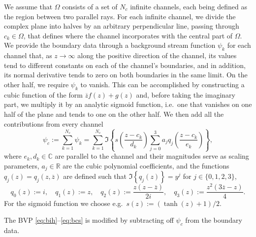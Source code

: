 \documentclass{article}
\newcommand{\reals}{\mathbb{R}}
\newcommand{\conj}[1]{{\overline{#1}}}
\newcommand{\imag}[1]{{\Im\left\{#1\right\}}}
\begin{document}
We assume that $\Omega$ consists of a set of $N_c$ infinite channels, each
being defined as the region between two parallel rays.  
For each infinite channel, we divide the complex
plane into halves by an arbitrary perpendicular line, passing through
$c_k\in\Omega$, that defines where the channel incorporates with the central
part of $\Omega$.  We provide the boundary data through a background stream function
$\psi_k$ for each channel that, as $z\to \infty$ along the positive direction of the channel, its
values tend to different constants on each of the channel's boundaries, and in
addition, its normal derivative tends to zero on both boundaries in the same
limit. On the other half, we require $\psi_k$ to vanish.  This can be
accomplished by constructing a cubic function of the form $\conj{z}f(z) + g(z)$
and, before taking the imaginary part, we multiply it by an analytic
sigmoid function, i.e.\ one that vanishes on one half of the plane and tends to
one on the other half. We then add all the contributions from every channel
\begin{equation}
   \psi_c:=\sum_{k=1}^{N_c} \psi_k = \sum_{k=1}^{N_c} \imag{ s\left(\frac{z-c_k}{d_k}\right) \sum_{j=0}^3 a_j q_j\left(\frac{z-c_k}{e_k}\right)},
\end{equation}
where $e_k,d_k\in\mathbb{C}$ are parallel to the channel and their magnitudes
serve as scaling parameters, $a_j\in\reals$ are the cubic polynomial coefficients, and the functions $q_j(z)=q_j(z,\conj{z})$ are defined such that
$\imag{q_j(z)} = y^j$ for $j\in\{0,1,2,3\}$,
\begin{equation}
   q_0(z) := i, \quad q_1(z) := z, \quad q_2(z) := \frac{z(z-\conj{z})}{2i}, \quad 
   q_3(z) := \frac{z^2(3\conj{z}-z)}{4}.
\end{equation}
For the sigmoid function we choose e.g.\ $s(z) := (\tanh(z)+1)/2$. 

The BVP \eqref{eq:bih}--\eqref{eq:bcs} is modified by subtracting off $\psi_c$
from the boundary data.
\end{document}
